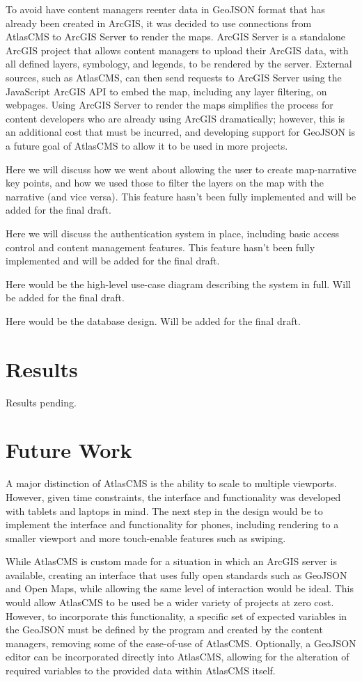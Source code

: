 \documentclass[11pt, final, conference, twocolumn]{IEEEtran}
\begin{document}
To avoid have content managers reenter data in GeoJSON format that has already been created in ArcGIS, it was decided to use connections from AtlasCMS to ArcGIS Server to render the maps. ArcGIS Server is a standalone ArcGIS project that allows content managers to upload their ArcGIS data, with all defined layers, symbology, and legends, to be rendered by the server. External sources, such as AtlasCMS, can then send requests to ArcGIS Server using the JavaScript ArcGIS API to embed the map, including any layer filtering, on webpages. Using ArcGIS Server to render the maps simplifies the process for content developers who are already using ArcGIS dramatically; however, this is an additional cost that must be incurred, and developing support for GeoJSON is a future goal of AtlasCMS to allow it to be used in more projects.

Here we will discuss how we went about allowing the user to create map-narrative key points, and how we used those to filter the layers on the map with the narrative (and vice versa). This feature hasn't been fully implemented and will be added for the final draft.

Here we will discuss the authentication system in place, including basic access control and content management features. This feature hasn't been fully implemented and will be added for the final draft.

Here would be the high-level use-case diagram describing the system in full. Will be added for the final draft.

Here would be the database design. Will be added for the final draft.

\section{Results}
Results pending.

\section{Future Work}
A major distinction of AtlasCMS is the ability to scale to multiple viewports. However, given time constraints, the interface and functionality was developed with tablets and laptops in mind. The next step in the design would be to implement the interface and functionality for phones, including rendering to a smaller viewport and more touch-enable features such as swiping.

While AtlasCMS is custom made for a situation in which an ArcGIS server is available, creating an interface that uses fully open standards such as GeoJSON and Open Maps, while allowing the same level of interaction would be ideal. This would allow AtlasCMS to be used be a wider variety of projects at zero cost. However, to incorporate this functionality, a specific set of expected variables in the GeoJSON must be defined by the program and created by the content managers, removing some of the ease-of-use of AtlasCMS. Optionally, a GeoJSON editor can be incorporated directly into AtlasCMS, allowing for the alteration of required variables to the provided data within AtlasCMS itself.
\end{document}
